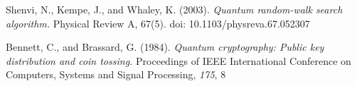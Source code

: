 \begin{thebibliography}{10}
    Shenvi, N., Kempe, J., and Whaley, K. (2003).
    \textit{Quantum random-walk search algorithm.}
    Physical Review A, 67(5). doi: 10.1103/physreva.67.052307

    Bennett, C., and Brassard, G. (1984).
    \textit{Quantum cryptography: Public key distribution and coin tossing.}
    Proceedings of IEEE International Conference on Computers, Systems and Signal Processing, \textit{175}, 8
\end{thebibliography}
